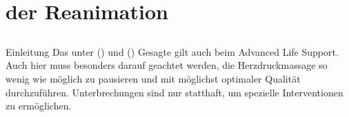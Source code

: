 
\section{ der Reanimation}

\subsection{}


\Text
{Einleitung}%
{%
Das unter \CO{[EHI]} () und \CO{[BLS]}
() Gesagte gilt auch beim Advanced
Life Support. 
%
Auch hier muss besonders darauf geachtet
werden, 
die Herzdruckmassage so wenig wie möglich zu pausieren 
und mit möglichst optimaler Qualität
durchzuführen. 
%
Unterbrechungen sind nur statthaft, um
spezielle Interventionen zu ermöglichen.
}%

%


